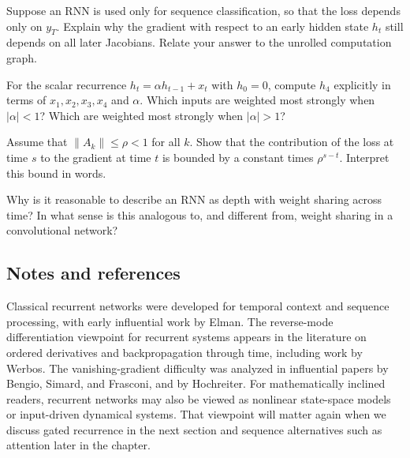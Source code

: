 \begin{exercise}
Suppose an RNN is used only for sequence classification, so that the loss depends only on $y_T$.
Explain why the gradient with respect to an early hidden state $h_t$ still depends on all later Jacobians.
Relate your answer to the unrolled computation graph.
\end{exercise}

\begin{exercise}
For the scalar recurrence $h_t=\alpha h_{t-1}+x_t$ with $h_0=0$, compute $h_4$ explicitly in terms of $x_1,x_2,x_3,x_4$ and $\alpha$.
Which inputs are weighted most strongly when $|\alpha|<1$?
Which are weighted most strongly when $|\alpha|>1$?
\end{exercise}

\begin{exercise}
Assume that $\|A_k\|\leq \rho<1$ for all $k$.
Show that the contribution of the loss at time $s$ to the gradient at time $t$ is bounded by a constant times $\rho^{s-t}$.
Interpret this bound in words.
\end{exercise}

\begin{exercise}
Why is it reasonable to describe an RNN as depth with weight sharing across time?
In what sense is this analogous to, and different from, weight sharing in a convolutional network?
\end{exercise}

\subsection*{Notes and references}

Classical recurrent networks were developed for temporal context and sequence processing, with early influential work by Elman.
The reverse-mode differentiation viewpoint for recurrent systems appears in the literature on ordered derivatives and backpropagation through time, including work by Werbos.
The vanishing-gradient difficulty was analyzed in influential papers by Bengio, Simard, and Frasconi, and by Hochreiter.
For mathematically inclined readers, recurrent networks may also be viewed as nonlinear state-space models or input-driven dynamical systems.
That viewpoint will matter again when we discuss gated recurrence in the next section and sequence alternatives such as attention later in the chapter.
